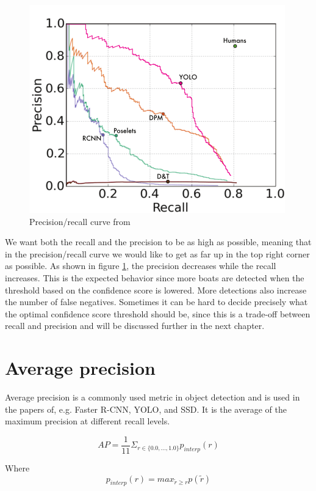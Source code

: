 \begin{figure}[h!]
    \centering
    \includegraphics[scale=0.4]{fig/yolo_prec_recall.png} 
    \caption{Precision/recall curve from \citep{YOLOv1}}
    \label{fig:yolo_prec_recall}
\end{figure}

\noindent
We want both the recall and the precision to be as high as possible, meaning that in the precision/recall curve we would like to get as far up in the top right corner as possible. As shown in figure \ref{fig:yolo_prec_recall}, the precision decreases while the recall increases. This is the expected behavior since more boats are detected when the threshold based on the confidence score is lowered. More detections also increase the number of false negatives. Sometimes it can be hard to decide precisely what the optimal confidence score threshold should be, since this is a trade-off between recall and precision and will be discussed further in the next chapter. 



\section{Average precision}
Average precision is a commonly used metric in object detection and is used in the papers of, e.g. Faster R-CNN, YOLO, and SSD. It is the average of the maximum precision at different recall levels.

\begin{equation}
    AP = \frac{1}{11} \Sigma_{r \in \{0.0, ... , 1.0\}} p_{interp}(r)
\end{equation}

Where
\begin{equation}
    p_{interp}(r) = max_{\tilde{r} \geq r} p(\tilde{r})
\end{equation}

